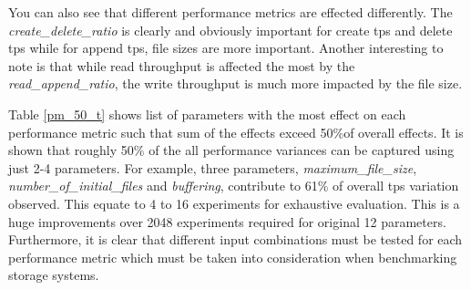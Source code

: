 You can also see that different performance metrics are effected differently. 
The \emph{create\_delete\_ratio} is clearly and obviously important for create tps and delete tps while for append tps, file sizes are more important. 
Another interesting to note is that while read throughput is affected the most by the \emph{read\_append\_ratio}, the write throughput is much more impacted by the file size.

Table \ref{pm_50_t} shows list of parameters with the most effect on each performance metric such that sum of the effects exceed 50\%of overall effects. 
It is shown that roughly 50\% of the all performance variances can be captured using just 2-4 parameters. 
For example, three parameters, \emph{maximum\_file\_size}, \emph{number\_of\_initial\_files} and \emph{buffering}, contribute to 61\% of overall tps variation observed. 
This equate to 4 to 16 experiments for exhaustive evaluation. 
This is a huge improvements over 2048 experiments required for original 12 parameters. 
Furthermore, it is clear that different input combinations must be tested for each performance metric which must be taken into consideration when benchmarking storage systems. 

